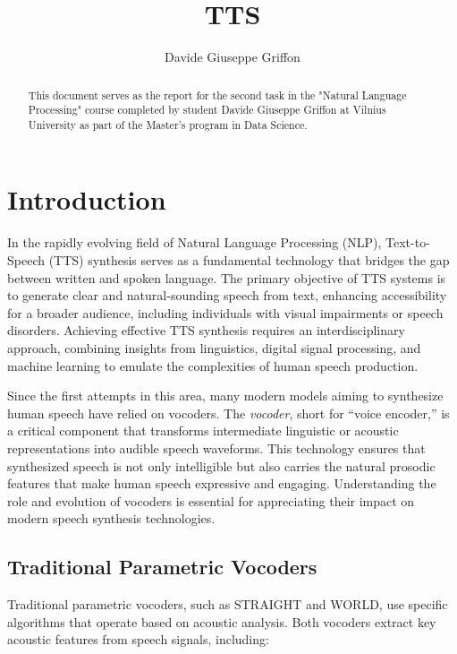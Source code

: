 \documentclass[12pt]{article}
\title{TTS}
\author{Davide Giuseppe Griffon}
\date{}
\begin{document}
\maketitle

\begin{abstract}
    This document serves as the report for the second task in the "Natural Language Processing" course completed by student Davide Giuseppe Griffon at Vilnius University as part of the Master's program in Data Science.
\end{abstract}

\tableofcontents

\newpage

\section{Introduction}

In the rapidly evolving field of Natural Language Processing (NLP), Text-to-Speech (TTS) synthesis serves as a fundamental technology that bridges the gap between written and spoken language. The primary objective of TTS systems is to generate clear and natural-sounding speech from text, enhancing accessibility for a broader audience, including individuals with visual impairments or speech disorders. Achieving effective TTS synthesis requires an interdisciplinary approach, combining insights from linguistics, digital signal processing, and machine learning to emulate the complexities of human speech production.

Since the first attempts in this area, many modern models aiming to synthesize human speech have relied on vocoders. The \textit{vocoder}, short for ``voice encoder,'' is a critical component that transforms intermediate linguistic or acoustic representations into audible speech waveforms. This technology ensures that synthesized speech is not only intelligible but also carries the natural prosodic features that make human speech expressive and engaging. Understanding the role and evolution of vocoders is essential for appreciating their impact on modern speech synthesis technologies.

\subsection{Traditional Parametric Vocoders}

Traditional parametric vocoders, such as STRAIGHT and WORLD, use specific algorithms that operate based on acoustic analysis. Both vocoders extract key acoustic features from speech signals, including:
\end{document}
